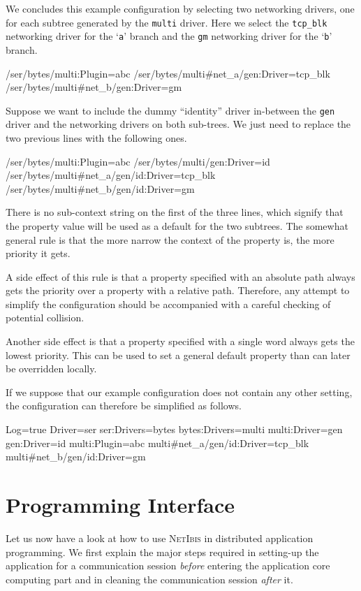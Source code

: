 \documentclass[11pt]{book}
\def\NetIbis{\textsc{NetIbis}\xspace}
\begin{document}
We concludes this example configuration by selecting two networking
drivers, one for each subtree generated by the \texttt{multi} driver.
Here we select the \texttt{tcp\_blk} networking driver for the
`\texttt{a}' branch and the \texttt{gm} networking driver for the
`\texttt{b}' branch.
\begin{Miniverb}

  /ser/bytes/multi:Plugin=abc
  /ser/bytes/multi#net_a/gen:Driver=tcp_blk
  /ser/bytes/multi#net_b/gen:Driver=gm

\end{Miniverb}

Suppose we want to include the dummy ``identity'' driver in-between
the \texttt{gen} driver and the networking drivers on both sub-trees.
We just need to replace the two previous lines with the following
ones.
\begin{Miniverb}

  /ser/bytes/multi:Plugin=abc
  /ser/bytes/multi/gen:Driver=id
  /ser/bytes/multi#net_a/gen/id:Driver=tcp_blk
  /ser/bytes/multi#net_b/gen/id:Driver=gm

\end{Miniverb}
There is no sub-context string on the first of the three lines, which
signify that the property value will be used as a default for the two
subtrees. The somewhat general rule is that the more narrow the
context of the property is, the more priority it gets.

A side effect of this rule is that a property specified with an
absolute path always gets the priority over a property with a relative
path. Therefore, any attempt to simplify the configuration should be
accompanied with a careful checking of potential collision.

Another side effect is that a property specified with a single word
always gets the lowest priority. This can be used to set a general
default property than can later be overridden locally.

If we suppose that our example configuration does not contain any
other setting, the configuration can therefore be simplified as
follows.
\begin{Miniverb}

  Log=true
  Driver=ser
  ser:Drivers=bytes
  bytes:Drivers=multi
  multi:Driver=gen
  gen:Driver=id
  multi:Plugin=abc
  multi#net_a/gen/id:Driver=tcp_blk
  multi#net_b/gen/id:Driver=gm

\end{Miniverb}

\section{Programming Interface}
\label{sec:progr-interf}
Let us now have a look at how to use \NetIbis in distributed
application programming. We first explain the major steps required in
setting-up the application for a communication session \emph{before}
entering the application core computing part and in cleaning the
communication session \emph{after} it.
\end{document}
